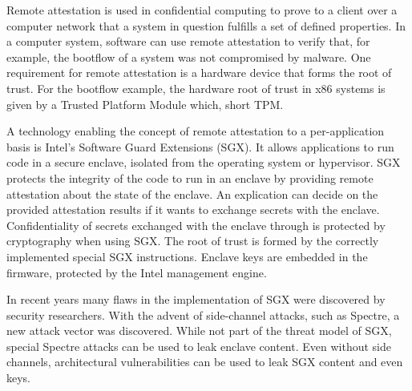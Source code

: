 


Remote attestation is used in confidential computing to prove to a client over a
computer network that a system in question fulfills a set of defined properties.
In a computer system, software can use remote attestation to verify that, for
example, the bootflow of a system was not compromised by malware. One
requirement for remote attestation is a hardware device that forms the root of
trust\cite{coker2011principles}. For the bootflow example, the hardware root of
trust in x86 systems is given by a Trusted Platform Module which, short TPM.

A technology enabling the concept of remote attestation to a per-application
basis is Intel's Software Guard Extensions (SGX). It allows applications to run
code in a secure enclave, isolated from the operating system or hypervisor. SGX
protects the integrity of the code to run in an enclave by providing remote
attestation about the state of the enclave. An explication can decide on the
provided attestation results if it wants to exchange secrets with the enclave.
Confidentiality of secrets exchanged with the enclave through is protected by
cryptography when using SGX. The root of trust is formed by the correctly
implemented special SGX instructions. Enclave keys are embedded in the firmware,
protected by the Intel management engine.\cite{costan2016intel}

In recent years many flaws in the implementation of SGX were discovered by
security researchers. With the advent of side-channel attacks, such as Spectre,
a new attack vector was discovered. While not part of the threat model of SGX,
special Spectre attacks can be used to leak enclave
content.\cite{chen2019sgxpectre, van2018foreshadow} Even without side channels,
architectural vulnerabilities can be used to leak SGX content and even
keys.\cite{borrello2022aepic}

